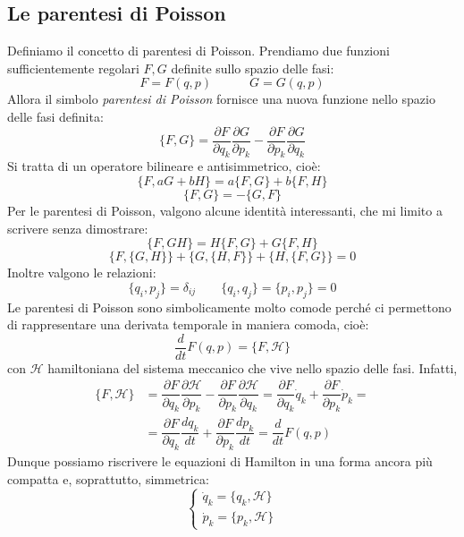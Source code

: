 \documentclass[a4paper,openany]{article}
\begin{document}
	\subsection{Le parentesi di Poisson}
	Definiamo il concetto di parentesi di Poisson. Prendiamo due funzioni sufficientemente regolari $F,G$ definite sullo spazio delle fasi:
	$$
	F=F(q,p) \quad \quad \quad G=G(q,p)
	$$
	Allora il simbolo \textit{parentesi di Poisson} fornisce una nuova funzione nello spazio delle fasi definita:
	\begin{equation}\label{key}
		\{F,G\} = \dfrac{\partial F}{\partial q_k}\dfrac{\partial G}{\partial p_k}-\dfrac{\partial F}{\partial p_k}\dfrac{\partial G}{\partial q_k}
	\end{equation}
Si tratta di un operatore bilineare e antisimmetrico, cioè:
\begin{equation}\label{key}
	\{F,aG+bH\} = a\{F,G\}+b\{F,H\}
\end{equation}
\begin{equation*}
	\{F,G\} = -\{G,F\}
\end{equation*}
Per le parentesi di Poisson, valgono alcune identità interessanti, che mi limito a scrivere senza dimostrare:
\begin{equation}
	\{F,GH\} = H\{F,G\} + G\{F,H\}
	\label{ParPoisson}
\end{equation}
$$
\{F,\{G,H\}\} + \{G,\{H,F\}\}+\{H,\{F,G\}\} = 0
$$
Inoltre valgono le relazioni:
\begin{equation}\label{key}
	\{q_i,p_j\} = \delta_{ij} \quad \quad \{q_i,q_j\} = 	\{p_i,p_j\} = 0
\end{equation}
Le parentesi di Poisson sono simbolicamente molto comode perché ci permettono di rappresentare una derivata temporale in maniera comoda, cioè:
\begin{equation}
	\dfrac{d}{dt}F(q,p) = \{F,\mathcal{H}\}
	\label{HamilNulla}
\end{equation}
con $\mathcal{H}$ hamiltoniana del sistema meccanico che vive nello spazio delle fasi. Infatti,
\begin{equation}\label{key}
	\begin{aligned}
		\{F,\mathcal{H}\} &= \dfrac{\partial F}{\partial q_k}\dfrac{\partial \mathcal{H}}{\partial p_k}-\dfrac{\partial F}{\partial p_k}\dfrac{\partial \mathcal{H}}{\partial q_k} = \dfrac{\partial F}{\partial q_k}\dot{q}_k+\dfrac{\partial F}{\partial p_k}\dot{p}_k = \\
		&= \dfrac{\partial F}{\partial q_k}\dfrac{dq_k}{dt}+\dfrac{\partial F}{\partial p_k}\dfrac{dp_k}{dt} = \dfrac{d}{dt}F(q,p)
	\end{aligned}
\end{equation}
Dunque possiamo riscrivere le equazioni di Hamilton in una forma ancora più compatta e, soprattutto, simmetrica:
\begin{equation}\label{key}
	\begin{cases}
		\dot{q}_k = \{q_k,\mathcal{H}\} \\
		\dot{p}_k = \{p_k, \mathcal{H}\}
	\end{cases}
\end{equation}
\end{document}
